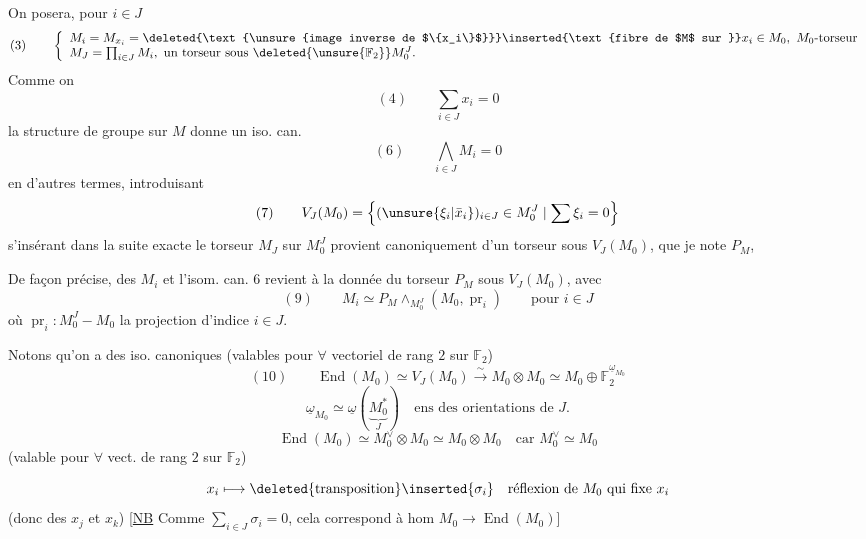 On posera, pour $i\in J$
\[
(3)\qquad
\left\{\begin{array}{l}
M_i=M_{x_i}=\deleted{\text{\unsure{image inverse de $\{x_i\}$}}}
\inserted{\text{fibre de $M$ sur }}x_i\in M_0,\ M_0\text{-torseur}\\
M_J=\prod_{i\in J}M_i,\ \text{un torseur sous }\deleted{\unsure{\mathbb{F}_2}}M_0^J.
\end{array}\right.
\]
Comme on
\[
(4)\qquad\sum_{i\in J}x_i=0
\]
la structure de groupe sur $M$ donne un iso. can.
\[
(6)\qquad\bigwedge_{i\in J}M_i=0
\]
en d'autres termes, introduisant
\[
(7)\qquad V_J(M_0)=\left\{(\unsure{\xi_i|\bar{x}_i})_{i\in J}\in M_0^J\mid\sum\xi_i=0\right\}
\]
s'insérant dans la suite exacte
le torseur $M_J$ sur $M_0^J$ provient canoniquement d'un torseur sous $V_J(M_0)$, que je note $P_M$,

De façon précise,  des  $M_i$ et  l'isom. can. $6$ revient à la donnée du torseur $P_M$ sous $V_J(M_0)$, avec
\[
(9)\qquad M_i\simeq P_M\wedge_{M_0^J}(M_0,\operatorname{pr}_i)
\qquad\text{pour }i\in J
\]
où $\operatorname{pr}_i:M_0^J\mathbin{-}M_0$ la projection d'indice $i\in J$.

Notons qu'on a des iso. canoniques (valables pour $\forall$ vectoriel de rang $2$ sur $\mathbb{F}_2$)
\[
(10)\qquad
\operatorname{End}(M_0)\simeq V_J(M_0)\xrightarrow{\sim}M_0\otimes M_0
\simeq M_0\oplus\mathbb{F}_2^{\underline{\omega}_{M_0}}
\]
\[
\underline{\omega}_{M_0}\simeq\underline{\omega}
(\underbrace{M_0^*}_{J})\quad\text{ens des orientations de }J.
\]
\[
\operatorname{End}(M_0)\simeq M_0^\vee\otimes M_0\simeq M_0\otimes M_0
\quad\text{car }M_0^\vee\simeq M_0
\]
(valable pour $\forall$ vect. de rang $2$ sur $\mathbb{F}_2$)

\[
x_i\longmapsto\deleted{\text{transposition}}\inserted{\sigma_i}
\quad\text{réflexion de $M_0$ qui fixe $x_i$}
\]
(donc  des $x_j$ et $x_k$)
[\uline{NB} Comme $\sum_{i\in J}\sigma_i=0$, cela correspond à hom
$M_0\longrightarrow\operatorname{End}(M_0)$]

